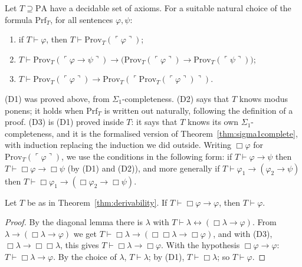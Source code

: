 \begin{theorem}\label{thm:derivability}
Let $T\supseteq\mathrm{PA}$ have a decidable set of axioms. For a suitable natural choice of the formula $\mathrm{Prf}_T$, for all sentences $\varphi,\psi$:
\begin{enumerate}
\item[(D1)] if $T\vdash\varphi$, then $T\vdash\mathrm{Prov}_T(\ulcorner\varphi\urcorner)$;
\item[(D2)] $T\vdash\mathrm{Prov}_T(\ulcorner\varphi\to\psi\urcorner)\to\bigl(\mathrm{Prov}_T(\ulcorner\varphi\urcorner)\to\mathrm{Prov}_T(\ulcorner\psi\urcorner)\bigr)$;
\item[(D3)] $T\vdash\mathrm{Prov}_T(\ulcorner\varphi\urcorner)\to\mathrm{Prov}_T(\ulcorner\mathrm{Prov}_T(\ulcorner\varphi\urcorner)\urcorner)$.
\end{enumerate}
\end{theorem}

(D1) was proved above, from $\Sigma_1$-completeness. (D2) says that $T$ knows modus ponens; it holds when $\mathrm{Prf}_T$ is written out naturally, following the definition of a proof. (D3) is (D1) proved inside $T$: it says that $T$ knows its own $\Sigma_1$-completeness, and it is the formalised version of Theorem~\ref{thm:sigma1complete}, with induction replacing the induction we did outside. Writing $\Box\varphi$ for $\mathrm{Prov}_T(\ulcorner\varphi\urcorner)$, we use the conditions in the following form: if $T\vdash\varphi\to\psi$ then $T\vdash\Box\varphi\to\Box\psi$ (by (D1) and (D2)), and more generally if $T\vdash\varphi_1\to(\varphi_2\to\psi)$ then $T\vdash\Box\varphi_1\to(\Box\varphi_2\to\Box\psi)$.

\begin{theorem}[Löb, 1955]\label{thm:lob}
Let $T$ be as in Theorem~\ref{thm:derivability}. If $T\vdash\Box\varphi\to\varphi$, then $T\vdash\varphi$.
\end{theorem}

\begin{proof}
By the diagonal lemma there is $\lambda$ with $T\vdash\lambda\leftrightarrow(\Box\lambda\to\varphi)$. From $\lambda\to(\Box\lambda\to\varphi)$ we get $T\vdash\Box\lambda\to(\Box\Box\lambda\to\Box\varphi)$, and with (D3), $\Box\lambda\to\Box\Box\lambda$, this gives $T\vdash\Box\lambda\to\Box\varphi$. With the hypothesis $\Box\varphi\to\varphi$: $T\vdash\Box\lambda\to\varphi$. By the choice of $\lambda$, $T\vdash\lambda$; by (D1), $T\vdash\Box\lambda$; so $T\vdash\varphi$.
\end{proof}

